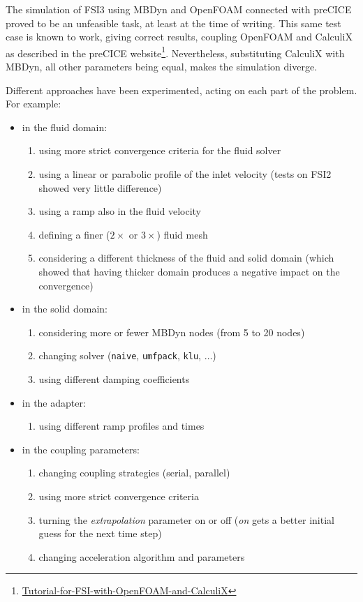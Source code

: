 The simulation of FSI3 using MBDyn and OpenFOAM connected with preCICE proved to be an unfeasible task, at least at the time of writing. This same test case is known to work, giving correct results, coupling OpenFOAM and CalculiX as described in the preCICE website\footnote{\href{https://github.com/precice/precice/wiki/Tutorial-for-FSI-with-OpenFOAM-and-CalculiX}{Tutorial-for-FSI-with-OpenFOAM-and-CalculiX}}.
Nevertheless, substituting CalculiX with MBDyn, all other parameters being equal, makes the simulation diverge.

Different approaches have been experimented, acting on each part of the problem. For example:

\begin{itemize}
	\item in the fluid domain:
	\begin{enumerate}
		\item using more strict convergence criteria for the fluid solver
		\item using a linear or parabolic profile of the inlet velocity (tests on FSI2 showed very little difference)
		\item using a ramp also in the fluid velocity
		\item defining a finer ($2\times$ or $3\times$) fluid mesh
		\item considering a different thickness of the fluid and solid domain (which showed that having thicker domain produces a negative impact on the convergence)
	\end{enumerate}
	\item in the solid domain:
	\begin{enumerate}
		\item considering more or fewer MBDyn nodes (from 5 to 20 nodes)
		\item changing solver (\texttt{naive}, \texttt{umfpack}, \texttt{klu}, $\ldots$)
		\item using different damping coefficients
	\end{enumerate}
	\item in the adapter:
	\begin{enumerate}
		\item using different ramp profiles and times
	\end{enumerate}
	\item in the coupling parameters:
	\begin{enumerate}
		\item changing coupling strategies (serial, parallel)
		\item using more strict convergence criteria
		\item turning the \textit{extrapolation} parameter on  or off (\textit{on} gets a better initial guess for the next time step)
		\item changing acceleration algorithm and parameters
	\end{enumerate}
\end{itemize}


